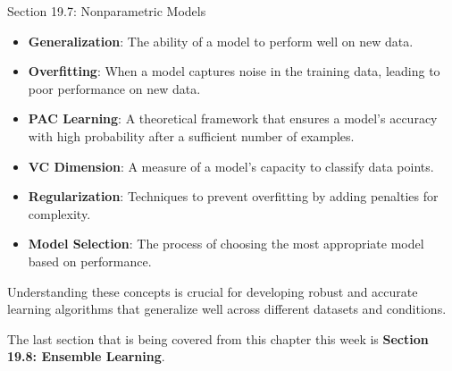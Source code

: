 \begin{notes}{Section 19.7: Nonparametric Models}
\begin{highlight}
    \end{highlight}
    
    \begin{highlight}
    
        \begin{itemize}
            \item \textbf{Generalization}: The ability of a model to perform well on new data.
            \item \textbf{Overfitting}: When a model captures noise in the training data, leading to poor performance on new data.
            \item \textbf{PAC Learning}: A theoretical framework that ensures a model's accuracy with high probability after a sufficient number of examples.
            \item \textbf{VC Dimension}: A measure of a model's capacity to classify data points.
            \item \textbf{Regularization}: Techniques to prevent overfitting by adding penalties for complexity.
            \item \textbf{Model Selection}: The process of choosing the most appropriate model based on performance.
        \end{itemize}
    
        Understanding these concepts is crucial for developing robust and accurate learning algorithms that generalize well across different datasets and conditions.
    
    \end{highlight}
\end{notes}

The last section that is being covered from this chapter this week is \textbf{Section 19.8: Ensemble Learning}.

